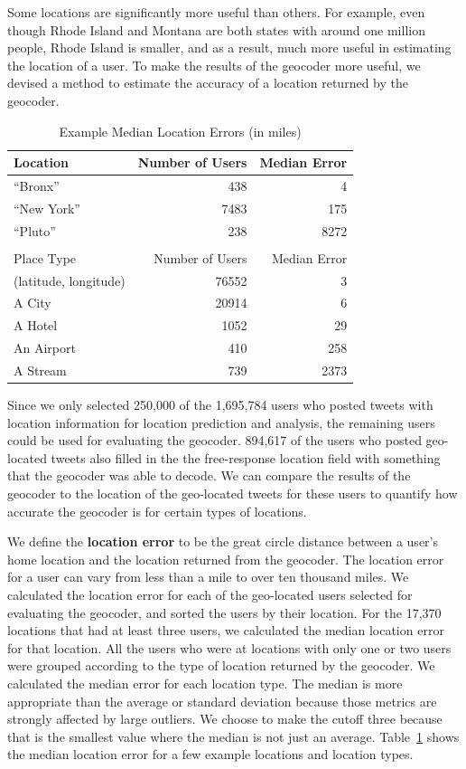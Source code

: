Some locations are significantly more useful than others.
For example, even though Rhode Island and Montana are both states with around
one million people, Rhode Island is smaller, and as a result, much more useful
in estimating the location of a user.
To make the results of the geocoder more useful, we devised a method to
estimate the accuracy of a location returned by the geocoder.

\begin{table}[t]
\centering
\caption{Example Median Location Errors (in miles)}
\begin{tabular}{l r r}
Location&Number of Users&Median Error\\ \hline
``Bronx''&438&4\\
``New York''&7483&175\\
``Pluto''&238&8272\\ \hline
\\
Place Type&Number of Users&Median Error\\ \hline
(latitude, longitude)&76552&3\\
A City&20914&6\\
A Hotel&1052&29\\
An Airport&410&258\\
A Stream&739&2373\\
\hline\end{tabular}
\label{tab:MedianLocErr}
\end{table}

Since we only selected 250,000 of the 1,695,784 users who posted tweets with
location information for location prediction and analysis, the remaining users
could be used for evaluating the geocoder.
%
894,617 of the users who posted geo-located tweets also filled in the
the free-response location field with something that the geocoder was able to
decode.
%
We can compare the results of the geocoder to the location of the geo-located
tweets for these users to quantify how accurate the geocoder is for certain
types of locations.

We define the \textbf{location error} to be the great circle distance between a
user's home location and the location returned from the geocoder.
%
The location error for a user can vary from less than a mile to over ten
thousand miles.
%
We calculated the location error for each of the geo-located users selected for
evaluating the geocoder, and sorted the users by their location.
%
For the 17,370 locations that had at least three users, we calculated the median
location error for that location.
%
All the users who were at locations with only one or two users were grouped
according to the type of location returned by the geocoder.
%
We calculated the median error for each location type.
%
The median is more appropriate than the average or standard deviation because
those metrics are strongly affected by large outliers.
%
We choose to make the cutoff three because that is the smallest value where the
median is not just an average.
Table~\ref{tab:MedianLocErr} shows the median location error for a few example
locations and location types.

